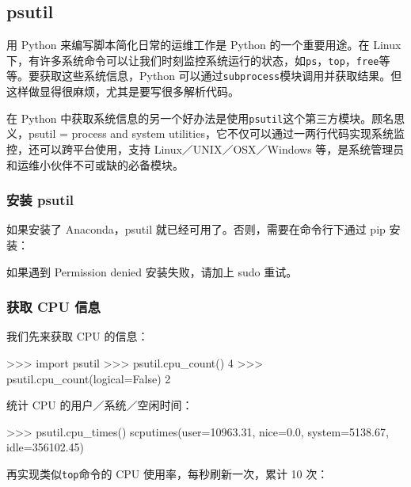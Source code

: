 \hypertarget{psutil}{%
\subsection{psutil}\label{psutil}}

用 Python 来编写脚本简化日常的运维工作是 Python 的一个重要用途。在 Linux
下，有许多系统命令可以让我们时刻监控系统运行的状态，如\texttt{ps}，\texttt{top}，\texttt{free}等等。要获取这些系统信息，Python
可以通过\texttt{subprocess}模块调用并获取结果。但这样做显得很麻烦，尤其是要写很多解析代码。

在 Python
中获取系统信息的另一个好办法是使用\texttt{psutil}这个第三方模块。顾名思义，psutil
= process and system
utilities，它不仅可以通过一两行代码实现系统监控，还可以跨平台使用，支持
Linux／UNIX／OSX／Windows
等，是系统管理员和运维小伙伴不可或缺的必备模块。

\hypertarget{ux5b89ux88c5-psutil}{%
\subsubsection{安装 psutil}\label{ux5b89ux88c5-psutil}}

如果安装了 Anaconda，psutil 就已经可用了。否则，需要在命令行下通过 pip
安装：


如果遇到 Permission denied 安装失败，请加上 sudo 重试。

\hypertarget{ux83b7ux53d6-cpu-ux4fe1ux606f}{%
\subsubsection{获取 CPU 信息}\label{ux83b7ux53d6-cpu-ux4fe1ux606f}}

我们先来获取 CPU 的信息：

\begin{pythoncode}
>>> import psutil
>>> psutil.cpu_count() 
4
>>> psutil.cpu_count(logical=False) 
2
\end{pythoncode}

统计 CPU 的用户／系统／空闲时间：

\begin{pythoncode}
>>> psutil.cpu_times()
scputimes(user=10963.31, nice=0.0, system=5138.67, idle=356102.45)
\end{pythoncode}

再实现类似\texttt{top}命令的 CPU 使用率，每秒刷新一次，累计 10 次：

